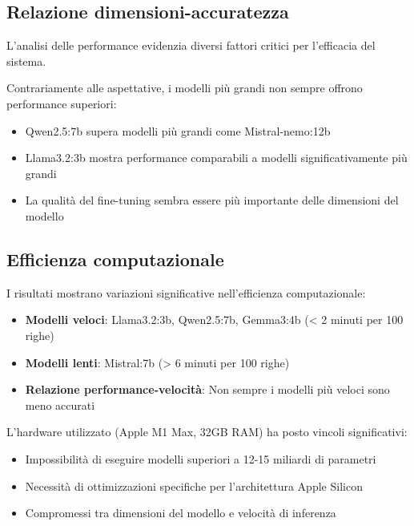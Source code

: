 \documentclass[12pt]{report}
\begin{document}
\subsection{Relazione dimensioni-accuratezza}
\label{subsec:relazione_dimensioni_accuratezza}

L'analisi delle performance evidenzia diversi fattori critici per l'efficacia del sistema.

Contrariamente alle aspettative, i modelli più grandi non sempre offrono performance superiori:
\begin{itemize}
    \item Qwen2.5:7b supera modelli più grandi come Mistral-nemo:12b
    \item Llama3.2:3b mostra performance comparabili a modelli significativamente più grandi
    \item La qualità del fine-tuning sembra essere più importante delle dimensioni del modello
\end{itemize}

\subsection{Efficienza computazionale}
\label{subsec:efficienza_computazionale}

I risultati mostrano variazioni significative nell'efficienza computazionale:
\begin{itemize}
    \item \textbf{Modelli veloci}: Llama3.2:3b, Qwen2.5:7b, Gemma3:4b (< 2 minuti per 100 righe)
    \item \textbf{Modelli lenti}: Mistral:7b (> 6 minuti per 100 righe)
    \item \textbf{Relazione performance-velocità}: Non sempre i modelli più veloci sono meno accurati
\end{itemize}


L'hardware utilizzato (Apple M1 Max, 32GB RAM) ha posto vincoli significativi:
\begin{itemize}
    \item Impossibilità di eseguire modelli superiori a 12-15 miliardi di parametri
    \item Necessità di ottimizzazioni specifiche per l'architettura Apple Silicon
    \item Compromessi tra dimensioni del modello e velocità di inferenza
\end{itemize}
\end{document}
